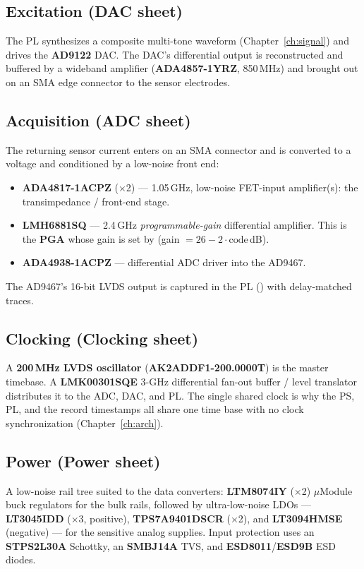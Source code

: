 \subsection{Excitation (DAC sheet)}
The PL synthesizes a composite multi-tone waveform (Chapter~\ref{ch:signal}) and
drives the \textbf{AD9122} DAC. The DAC's differential output is reconstructed
and buffered by a wideband amplifier (\textbf{ADA4857-1YRZ}, 850\,MHz) and
brought out on an SMA edge connector to the sensor electrodes.

\subsection{Acquisition (ADC sheet)}
The returning sensor current enters on an SMA connector and is converted to a
voltage and conditioned by a low-noise front end:
\begin{itemize}[nosep]
  \item \textbf{ADA4817-1ACPZ} ($\times$2) --- 1.05\,GHz, low-noise FET-input
        amplifier(s): the transimpedance / front-end stage.
  \item \textbf{LMH6881SQ} --- 2.4\,GHz \emph{programmable-gain} differential
        amplifier. This is the \textbf{PGA} whose gain is set by
         (gain $= 26 - 2\cdot\text{code}$\,dB).
  \item \textbf{ADA4938-1ACPZ} --- differential ADC driver into the AD9467.
\end{itemize}
The AD9467's 16-bit LVDS output is captured in the PL
() with delay-matched traces.

\subsection{Clocking (Clocking sheet)}
A \textbf{200\,MHz LVDS oscillator} (\textbf{AK2ADDF1-200.0000T}) is the master
timebase. A \textbf{LMK00301SQE} 3-GHz differential fan-out buffer / level
translator distributes it to the ADC, DAC, and PL. The single shared clock is
why the PS, PL, and the record timestamps all share one time base with no clock
synchronization (Chapter~\ref{ch:arch}).

\subsection{Power (Power sheet)}
A low-noise rail tree suited to the data converters: \textbf{LTM8074IY} ($\times$2)
$\mu$Module buck regulators for the bulk rails, followed by ultra-low-noise LDOs
--- \textbf{LT3045IDD} ($\times$3, positive), \textbf{TPS7A9401DSCR} ($\times$2),
and \textbf{LT3094HMSE} (negative) --- for the sensitive analog supplies. Input
protection uses an \textbf{STPS2L30A} Schottky, an \textbf{SMBJ14A} TVS, and
\textbf{ESD8011}/\textbf{ESD9B} ESD diodes.

